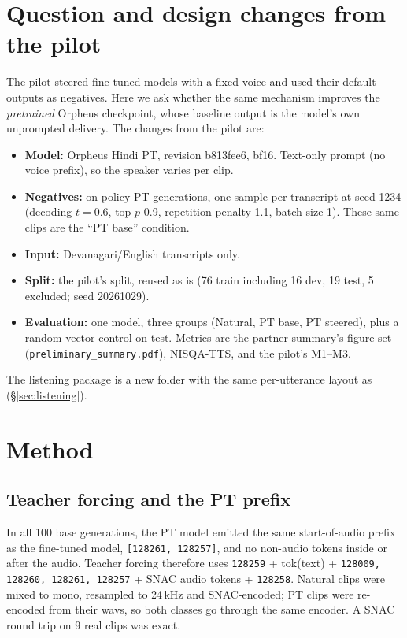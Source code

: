 \documentclass[11pt]{article}
\begin{document}
\section{Question and design changes from the pilot}
The pilot steered fine-tuned models with a fixed voice and used their default outputs as negatives. Here we ask whether the same mechanism improves the \emph{pretrained} Orpheus checkpoint, whose baseline output is the model's own unprompted delivery. The changes from the pilot are:
\begin{itemize}
\item \textbf{Model:} Orpheus Hindi PT, revision b813fee6, bf16. Text-only prompt (no voice prefix), so the speaker varies per clip.
\item \textbf{Negatives:} on-policy PT generations, one sample per transcript at seed 1234 (decoding $t=0.6$, top-$p$ 0.9, repetition penalty 1.1, batch size 1). These same clips are the ``PT base'' condition.
\item \textbf{Input:} Devanagari/English transcripts only.
\item \textbf{Split:} the pilot's split, reused as is (76 train including 16 dev, 19 test, 5 excluded; seed 20261029).
\item \textbf{Evaluation:} one model, three groups (Natural, PT base, PT steered), plus a random-vector control on test. Metrics are the partner summary's figure set (\texttt{preliminary\_summary.pdf}), NISQA-TTS, and the pilot's M1--M3.
\end{itemize}
The listening package is a new folder with the same per-utterance layout as  (\S\ref{sec:listening}).

\section{Method}
\subsection{Teacher forcing and the PT prefix}
In all 100 base generations, the PT model emitted the same start-of-audio prefix as the fine-tuned model, \texttt{[128261, 128257]}, and no non-audio tokens inside or after the audio. Teacher forcing therefore uses \texttt{128259} + tok(text) + \texttt{128009, 128260, 128261, 128257} + SNAC audio tokens + \texttt{128258}. Natural clips were mixed to mono, resampled to 24\,kHz and SNAC-encoded; PT clips were re-encoded from their wavs, so both classes go through the same encoder. A SNAC round trip on 9 real clips was exact.
\end{document}
